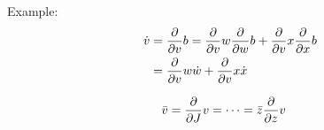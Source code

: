 \begin{solution}
Example:
\begin{align*}
\dot v &= \pdv v b = \pdv v w \pdv wb + \pdv v x \pdv x b \\
&= \pdv v w \dot w + \pdv v x \dot x
\end{align*}


\begin{align*}
\bar v &= \pdv J v = \dots = \bar z \pdv z v
\end{align*}


\end{solution}


